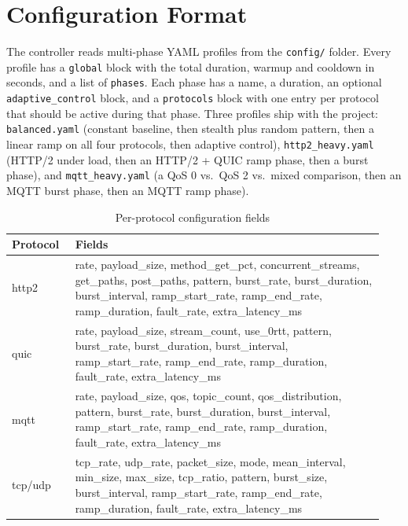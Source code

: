 \section{Configuration Format}

The controller reads multi-phase YAML profiles from the \texttt{config/}
folder. Every profile has a \texttt{global} block with the total duration,
warmup and cooldown in seconds, and a list of \texttt{phases}. Each phase has
a name, a duration, an optional \texttt{adaptive\_control} block, and a
\texttt{protocols} block with one entry per protocol that should be active
during that phase. Three profiles ship with the project: \texttt{balanced.yaml}
(constant baseline, then stealth plus random pattern, then a linear ramp on
all four protocols, then adaptive control), \texttt{http2\_heavy.yaml}
(HTTP/2 under load, then an HTTP/2 + QUIC ramp phase, then a burst phase),
and \texttt{mqtt\_heavy.yaml} (a QoS 0 vs.\ QoS 2 vs.\ mixed comparison,
then an MQTT burst phase, then an MQTT ramp phase).

\begin{table}[t]
\centering
\caption{Per-protocol configuration fields}
\label{tab:config-fields}
\footnotesize
\begin{tabular}{@{}p{0.16\linewidth}p{0.78\linewidth}@{}}
\toprule
\textbf{Protocol} & \textbf{Fields} \\
\midrule
http2 & rate, payload\_size, method\_get\_pct, concurrent\_streams, get\_paths, post\_paths, pattern, burst\_rate, burst\_duration, burst\_interval, ramp\_start\_rate, ramp\_end\_rate, ramp\_duration, fault\_rate, extra\_latency\_ms \\
quic & rate, payload\_size, stream\_count, use\_0rtt, pattern, burst\_rate, burst\_duration, burst\_interval, ramp\_start\_rate, ramp\_end\_rate, ramp\_duration, fault\_rate, extra\_latency\_ms \\
mqtt & rate, payload\_size, qos, topic\_count, qos\_distribution, pattern, burst\_rate, burst\_duration, burst\_interval, ramp\_start\_rate, ramp\_end\_rate, ramp\_duration, fault\_rate, extra\_latency\_ms \\
tcp/udp & tcp\_rate, udp\_rate, packet\_size, mode, mean\_interval, min\_size, max\_size, tcp\_ratio, pattern, burst\_size, burst\_interval, ramp\_start\_rate, ramp\_end\_rate, ramp\_duration, fault\_rate, extra\_latency\_ms \\
\bottomrule
\end{tabular}
\end{table}

